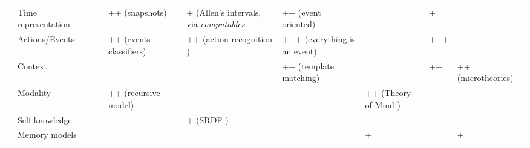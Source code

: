 \documentclass[a4paper, twocolumn]{article}
\begin{document}
\begin{landscape}
\begin{table}
\begin{center}
\begin{tabular}{p{0.2cm}p{3.4cm}p{1.6cm}p{1.3cm}p{1.7cm}p{1.5cm}p{2cm}p{2cm}p{2cm}p{1.4cm}p{1.8cm}}
                                                               & Time representation &                           &                             & ++ (snapshots)              &                             & + (Allen's intervals, via \emph{computables} & ++ (event oriented)                   &                                               & +                             &                                \\
                                                                    & Actions/Events &                           &                             & ++ (events classifiers)     &                             & ++ (action recognition \cite{Beetz2010a})  & +++ (everything is an event)            &                                               & +++                           &                                \\
                                                                           & Context &                           &                             &                             &                             &                                    & ++ (template matching)                          &                                               & ++                            & ++ (microtheories)             \\
                                                                          & Modality &                           &                             & ++ (recursive model)        &                             &                                    &                                                 & ++ (Theory of Mind \cite{Warnier2012a})       &                               &                                \\
                                                                    & Self-knowledge &                           &                             &                             &                             & + (SRDF \cite{Kunze2011})          &                                                 &                                               &                               &                                \\
                                                                     & Memory models &                           &                             &                             &                             &                                    &                                                 & +                                             &                               & +                              \\

\end{tabular}
\end{center}
\end{table}
\end{landscape}
\end{document}
